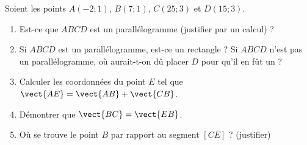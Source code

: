
\begin{exercice}[\ldots/5]\label{exosmath-0669}

    Soient les points \( A(-2;1)\), \( B(7;1)\), \( C(25;3)\) et \( D(15;3)\).
    \begin{enumerate}
        \item
            Est-ce que \( ABCD\) est un parallélogramme (justifier par un calcul) ? 
        \item
            Si \( ABCD\) est un parallélogramme, est-ce un rectangle ? Si \( ABCD\) n'est pas un parallélogramme, où aurait-t-on dû placer \( D\) pour qu'il en fût un ?
        \item
            Calculer les coordonnées du point \( E\) tel que \( \vect{ AE }=\vect{ AB }+\vect{ CB }\).
        \item
            Démontrer que \( \vect{ BC }=\vect{ EB }\).
        \item
            Où se trouve le point \( B\) par rapport au segment \( [CE]\) ? (justifier)
    \end{enumerate}

\end{exercice}
